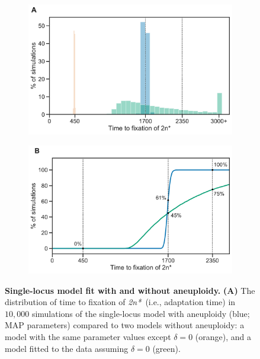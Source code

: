 \documentclass[12pt]{extarticle}
\newcommand{\eumt}{\emph{2n*}}
\begin{document}
\begin{figure}[h!]
  \begin{subfigure}{0.5\textwidth}
      \centering
      \includegraphics[width=\textwidth]{../figures/fixation-plot-a.pdf}      
      \label{fig:fit}
  \end{subfigure}
  \begin{subfigure}{0.5\textwidth}
      \centering
      \includegraphics[width=\textwidth]{../figures/fixation-plot-b.pdf}      
      \label{fig:fit-cumulative}
  \end{subfigure}
  \caption{
    \textbf{Single-locus model fit with and without aneuploidy.}
    \textbf{(A)} The distribution of time to fixation of \eumt\ (i.e., adaptation time) in $10,000$ simulations of the single-locus model with aneuploidy (blue; MAP parameters) compared to two models without aneuploidy: a model with the same parameter values except $\delta=0$ (orange), and a model fitted to the data assuming $\delta=0$ (green).
}
\end{figure}
\end{document}
